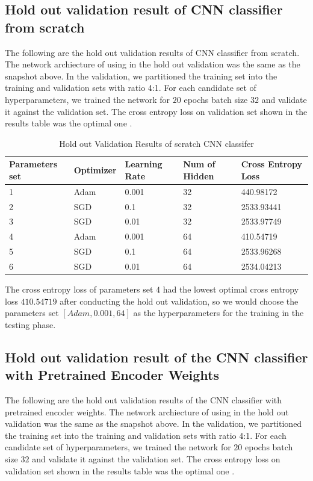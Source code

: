 \documentclass{article}
\begin{document}
\subsection{Hold out validation result of CNN classifier from scratch}

The following are the hold out validation results of CNN classifier from scratch. The network archiecture of using in the hold out validation was the same as the snapshot above. In the validation, we partitioned the training set into the training and validation sets with ratio 4:1. For each candidate set of hyperparameters, we trained the network for $20$ epochs batch size $32$ and validate it against the validation set. The cross entropy loss on validation set shown in the results table was the optimal one .

\pagebreak

\begin{table}[htb]
\caption{Hold out Validation Results of scratch CNN classifer}
	\label{sample-table}
	\centering
\begin{tabular}{lllll}
\toprule
		\cmidrule{1-5}
		Parameters set& Optimizer & Learning Rate & Num of Hidden & Cross Entropy Loss 		\\
		\midrule
 			1 & Adam & 0.001 & 32 & 440.98172 \\
 			2 & SGD & 0.1 & 32 &  2533.93441\\
 			3 & SGD & 0.01 & 32 & 2533.97749 \\
 			4 & Adam & 0.001 & 64 & 410.54719 \\
 			5 & SGD & 0.1 & 64 &  2533.96268\\
 			6 & SGD & 0.01 & 64 & 2534.04213 \\
\bottomrule
\end{tabular}
\end{table}

The cross entropy loss of parameters set $4$ had the lowest optimal cross entropy loss $410.54719$ after conducting the hold out validation, so we would choose the parameters set $[Adam, 0.001, 64]$ as the hyperparameters for the training in the testing phase.


\subsection{Hold out validation result of the CNN classifier with Pretrained Encoder Weights}

The following are the hold out validation results of the CNN classifier with pretrained encoder weights. The network archiecture of using in the hold out validation was the same as the snapshot above. In the validation, we partitioned the training set into the training and validation sets with ratio 4:1. For each candidate set of hyperparameters, we trained the network for $20$ epochs batch size $32$ and validate it against the validation set.  The cross entropy loss on validation set shown in the results table was the optimal one .
\end{document}
